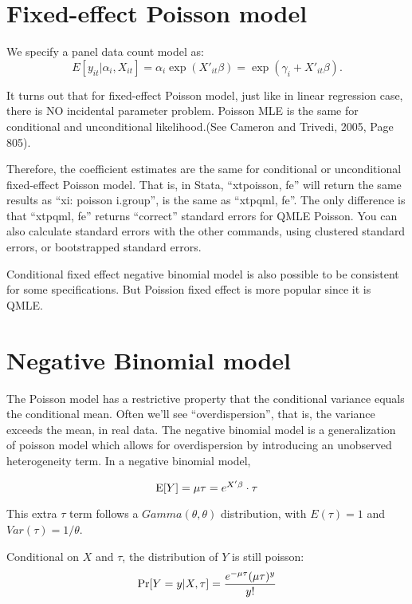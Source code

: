 \section{Fixed-effect Poisson model}

We specify a panel data count model as:
\begin{equation}
E[y_{it} | \alpha_i, X_{it}]= \alpha_i \exp(X'_{it} \beta) =
\exp(\gamma_i + X'_{it} \beta). 
\end{equation}


It turns out that for fixed-effect Poisson model, just like in linear
regression case, there is NO incidental parameter problem.  Poisson
MLE is the same for conditional and unconditional likelihood.(See
Cameron and Trivedi, 2005, Page 805).

Therefore, the coefficient estimates are the same for conditional or
unconditional fixed-effect Poisson model.  That is, in Stata,
``xtpoisson, fe'' will return the same results as ``xi: poisson
i.group'', is the same as ``xtpqml, fe''.  The only difference is that
``xtpqml, fe'' returns ``correct'' standard errors for QMLE Poisson.
You can also calculate standard errors with the other commands, using
clustered standard errors, or bootstrapped standard errors.


Conditional fixed effect negative binomial model is also possible to
be consistent for some specifications.  But Poission fixed effect is
more popular since it is QMLE.

\section{Negative Binomial model}

The Poisson model has a restrictive property that the conditional
variance equals the conditional mean.  Often we'll see
``overdispersion'', that is, the variance exceeds the mean, in real
data.  The negative binomial model is a generalization of poisson
model which allows for overdispersion by introducing an unobserved
heterogeneity term.  In a negative binomial model,

\begin{equation}
{\rm E} [Y]=\mu \tau = e^{X' \beta} \cdot \tau
\end{equation}

This extra $\tau$ term follows a $Gamma(\theta, \theta)$
distribution, with $E(\tau)=1$ and $Var (\tau)=1/\theta$.  

Conditional on $X$ and $\tau$, the distribution of $Y$ is still poisson:
\begin{equation}
{\rm Pr} [Y=y | X, \tau]=\frac{e^{-\mu \tau} (\mu \tau)^y}{y! }
\end{equation}

